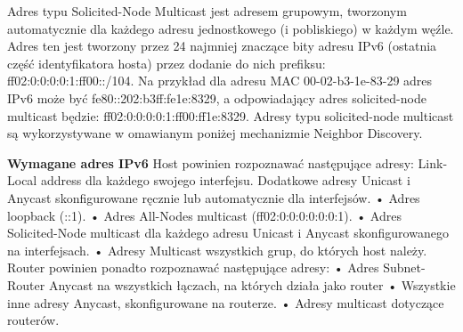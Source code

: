     Adres typu Solicited-Node Multicast jest adresem grupowym, tworzonym automatycznie dla
    każdego adresu jednostkowego (i pobliskiego) w każdym węźle. Adres ten jest tworzony
    przez 24 najmniej znaczące bity adresu IPv6 (ostatnia część identyfikatora hosta) przez
    dodanie do nich prefiksu: ff02:0:0:0:0:1:ff00::/104.
    Na przykład dla adresu MAC 00-02-b3-1e-83-29 adres IPv6 może być
    fe80::202:b3ff:fe1e:8329, a odpowiadający adres solicited-node multicast będzie:
    ff02:0:0:0:0:1:ff00:ff1e:8329.
    Adresy typu solicited-node multicast są wykorzystywane w omawianym poniżej
    mechanizmie Neighbor Discovery.

    \textbf{Wymagane adres IPv6}
    Host powinien rozpoznawać następujące adresy:
    Link-Local address dla każdego swojego interfejsu.
    Dodatkowe adresy Unicast i Anycast skonfigurowane ręcznie lub automatycznie dla
    interfejsów.
    • Adres loopback (::1).
    • Adres All-Nodes multicast (ff02:0:0:0:0:0:0:1).
    • Adres Solicited-Node multicast dla każdego adresu Unicast i Anycast skonfigurowanego
    na interfejsach.
    • Adresy Multicast wszystkich grup, do których host należy.
    Router powinien ponadto rozpoznawać następujące adresy:
    • Adres Subnet-Router Anycast na wszystkich łączach, na których działa jako router
    • Wszystkie inne adresy Anycast, skonfigurowane na routerze.
    • Adresy multicast dotyczące routerów.


